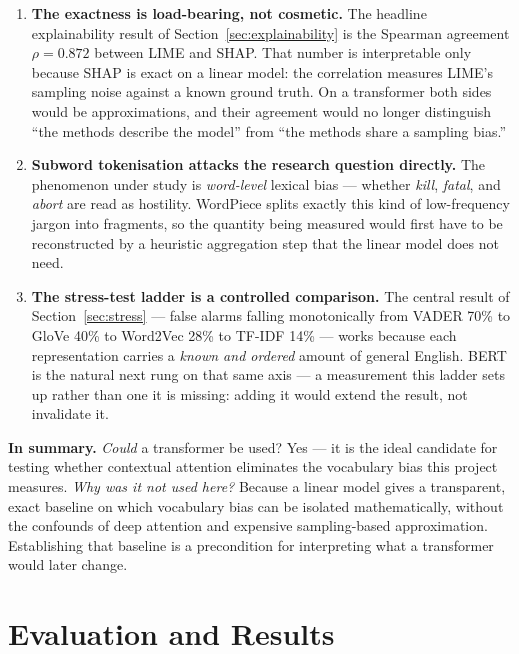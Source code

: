 \documentclass[11pt,a4paper]{article}
\begin{document}
\begin{enumerate}[leftmargin=*]
    \item \textbf{The exactness is load-bearing, not cosmetic.} The headline
    explainability result of Section~\ref{sec:explainability} is the Spearman
    agreement $\rho = 0.872$ between LIME and SHAP. That number is
    interpretable only because SHAP is exact on a linear model: the
    correlation measures LIME's sampling noise against a known ground truth.
    On a transformer both sides would be approximations, and their agreement
    would no longer distinguish ``the methods describe the model'' from ``the
    methods share a sampling bias.''

    \item \textbf{Subword tokenisation attacks the research question
    directly.} The phenomenon under study is \textit{word-level} lexical
    bias --- whether \textit{kill}, \textit{fatal}, and \textit{abort} are
    read as hostility. WordPiece splits exactly this kind of low-frequency
    jargon into fragments, so the quantity being measured would first have to
    be reconstructed by a heuristic aggregation step that the linear model
    does not need.

    \item \textbf{The stress-test ladder is a controlled comparison.} The
    central result of Section~\ref{sec:stress} --- false alarms falling
    monotonically from VADER 70\% to GloVe 40\% to Word2Vec 28\% to TF-IDF
    14\% --- works because each representation carries a \textit{known and
    ordered} amount of general English. BERT is the natural next rung on that
    same axis --- a measurement this ladder sets up rather than one it is
    missing: adding it would extend the result, not invalidate it.
\end{enumerate}

\textbf{In summary.} \textit{Could} a transformer be used? Yes --- it is the
ideal candidate for testing whether contextual attention eliminates the
vocabulary bias this project measures. \textit{Why was it not used here?}
Because a linear model gives a
transparent, exact baseline on which vocabulary bias can be isolated
mathematically, without the confounds of deep attention and expensive
sampling-based approximation. Establishing that baseline is a precondition for
interpreting what a transformer would later change.

\section{Evaluation and Results}
\label{sec:results}
\end{document}
